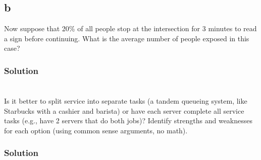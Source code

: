 \documentclass{amsart}
\begin{document}
\subsection*{b}
Now suppose that 20\% of all people stop at the intersection for 3 minutes to read a
sign before continuing. What is the average number of people exposed in this case?
\subsubsection*{Solution}

\section{} %
Is it better to split service into separate tasks (a tandem queueing system, like Starbucks
with a cashier and barista) or have each server complete all service tasks (e.g., have 2
servers that do both jobs)? Identify strengths and weaknesses for each option (using
common sense arguments, no math).
\subsubsection*{Solution}
\end{document}
